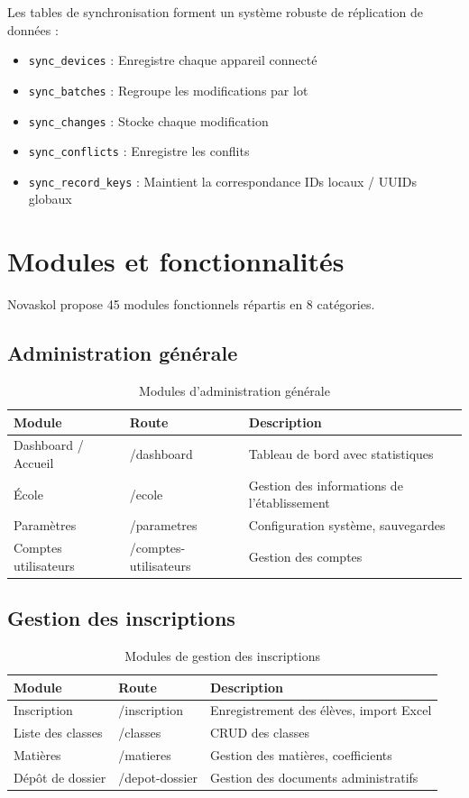 \documentclass[12pt,a4paper,twoside]{report}
\begin{document}
Les tables de synchronisation forment un système robuste de réplication de données :
\begin{itemize}
    \item \texttt{sync\_devices} : Enregistre chaque appareil connecté
    \item \texttt{sync\_batches} : Regroupe les modifications par lot
    \item \texttt{sync\_changes} : Stocke chaque modification
    \item \texttt{sync\_conflicts} : Enregistre les conflits
    \item \texttt{sync\_record\_keys} : Maintient la correspondance IDs locaux / UUIDs globaux
\end{itemize}

\section{Modules et fonctionnalités}

Novaskol propose 45 modules fonctionnels répartis en 8 catégories.

\subsection{Administration générale}

\begin{table}[h]
\centering
\caption{Modules d'administration générale}
\begin{tabular}{lll}
\toprule
Module & Route & Description \\
\midrule
Dashboard / Accueil & /dashboard & Tableau de bord avec statistiques \\
École & /ecole & Gestion des informations de l'établissement \\
Paramètres & /parametres & Configuration système, sauvegardes \\
Comptes utilisateurs & /comptes-utilisateurs & Gestion des comptes \\
\bottomrule
\end{tabular}
\end{table}

\subsection{Gestion des inscriptions}

\begin{table}[h]
\centering
\caption{Modules de gestion des inscriptions}
\begin{tabular}{lll}
\toprule
Module & Route & Description \\
\midrule
Inscription & /inscription & Enregistrement des élèves, import Excel \\
Liste des classes & /classes & CRUD des classes \\
Matières & /matieres & Gestion des matières, coefficients \\
Dépôt de dossier & /depot-dossier & Gestion des documents administratifs \\
\bottomrule
\end{tabular}
\end{table}
\end{document}
